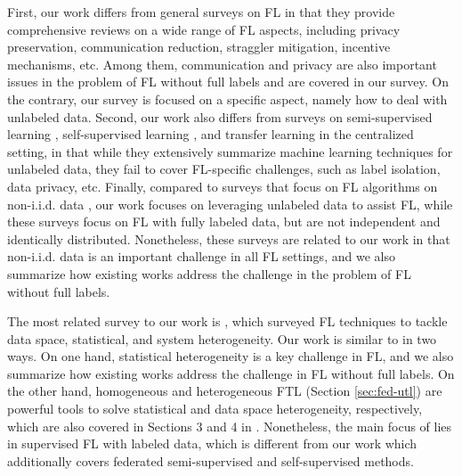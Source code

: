 \documentclass[11pt]{article}
\begin{document}
First, our work differs from general surveys on FL \cite{Yilun-kairouz2021advances,Yilun-yang2019federated,Yilun-li2020federatedsurvey} in that they provide comprehensive reviews on a wide range of FL aspects, including privacy preservation, communication reduction, straggler mitigation, incentive mechanisms, etc. Among them, communication and privacy are also important issues in the problem of FL without full labels and are covered in our survey. On the contrary, our survey is focused on a specific aspect, namely how to deal with unlabeled data. Second, our work also differs from surveys on semi-supervised learning \cite{Yilun-chapelle2009semi}, self-supervised learning \cite{Yilun-liu2021self}, and transfer learning \cite{Yilun-pan2010survey} in the centralized setting, in that while they extensively summarize machine learning techniques for unlabeled data, they fail to cover FL-specific challenges, such as label isolation, data privacy, etc. Finally, compared to surveys that focus on FL algorithms on non-i.i.d. data \cite{Yilun-wang2021field,Yilun-li2022federated,Yilun-zhu2021federated}, our work focuses on leveraging unlabeled data to assist FL, while these surveys focus on FL with fully labeled data, but are not independent and identically distributed. Nonetheless, these surveys are related to our work in that non-i.i.d. data is an important challenge in all FL settings, and we also summarize how existing works address the challenge in the problem of FL without full labels.

The most related survey to our work is \cite{Yilun-gao2022survey}, which surveyed FL techniques to tackle data space, statistical, and system heterogeneity. Our work is similar to \cite{Yilun-gao2022survey} in two ways. On one hand, statistical heterogeneity is a key challenge in FL, and we also summarize how existing works address the challenge in FL without full labels. On the other hand, homogeneous and heterogeneous FTL (Section \ref{sec:fed-utl}) are powerful tools to solve statistical and data space heterogeneity, respectively, which are also covered in Sections 3 and 4 in \cite{Yilun-gao2022survey}. Nonetheless, the main focus of \cite{Yilun-gao2022survey} lies in supervised FL with labeled data, which is different from our work which additionally covers federated semi-supervised and self-supervised methods.
\end{document}
